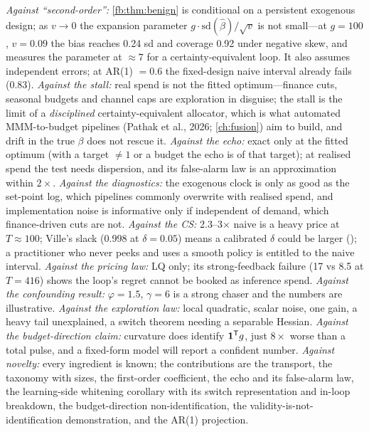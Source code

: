\emph{Against ``second-order'':} \cref{fb:thm:benign} is conditional on a persistent exogenous design; as $v \to 0$ the expansion parameter $g\cdot\mathrm{sd}(\hat\beta)/\sqrt v$ is not small---at $g = 100$, $v = 0.09$ the bias reaches 0.24 sd and coverage 0.92 under negative skew, and  measures the parameter at $\approx 7$ for a certainty-equivalent loop. It also assumes independent errors; at AR(1) $= 0.6$ the fixed-design naive interval already fails (0.83). \emph{Against the stall:} real spend is not the fitted optimum---finance cuts, seasonal budgets and channel caps are exploration in disguise; the stall is the limit of a \emph{disciplined} certainty-equivalent allocator, which is what automated MMM-to-budget pipelines (Pathak et al., 2026; \cref{ch:fusion}) aim to build, and drift in the true $\beta$ does not rescue it. \emph{Against the echo:} exact only at the fitted optimum (with a target $\ne 1$ or a budget the echo is of that target); at realised spend the test needs dispersion, and its false-alarm law is an approximation within $2\times$. \emph{Against the diagnostics:} the exogenous clock is only as good as the set-point log, which pipelines commonly overwrite with realised spend, and implementation noise is informative only if independent of demand, which finance-driven cuts are not. \emph{Against the CS:} 2.3--3$\times$ naive is a heavy price at $T \approx 100$; Ville's slack (0.998 at $\delta = 0.05$) means a calibrated $\delta$ could be larger (); a practitioner who never peeks and uses a smooth policy is entitled to the naive interval. \emph{Against the pricing law:} LQ only; its strong-feedback failure (17 vs 8.5 at $T = 416$) shows the loop's regret cannot be booked as inference spend. \emph{Against the confounding result:} $\varphi = 1.5$, $\gamma = 6$ is a strong chaser and the numbers are illustrative. \emph{Against the exploration law:} local quadratic, scalar noise, one gain, a heavy tail unexplained, a switch theorem needing a separable Hessian. \emph{Against the budget-direction claim:} curvature does identify $\mathbf{1}^{\mathsf{T}} g$, just $8\times$ worse than a total pulse, and a fixed-form model will report a confident number. \emph{Against novelty:} every ingredient is known; the contributions are the transport, the taxonomy with sizes, the first-order coefficient, the echo and its false-alarm law, the learning-side whitening corollary with its switch representation and in-loop breakdown, the budget-direction non-identification, the validity-is-not-identification demonstration, and the AR(1) projection.

